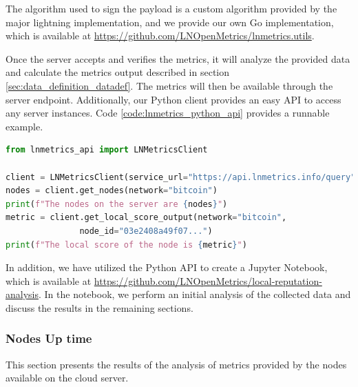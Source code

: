 The algorithm used to sign the payload is a custom algorithm provided by the major
lightning implementation, and we provide our own Go implementation, which is available
at \url{https://github.com/LNOpenMetrics/lnmetrics.utils}.

Once the server accepts and verifies the metrics, it will analyze the provided data and calculate the
metrics output described in section \ref{sec:data_definition_datadef}. The metrics will then be available
through the server endpoint. Additionally, our Python client provides an easy API to access any server instances.
Code \ref{code:lnmetrics_python_api} provides a runnable example.

\begin{lstlisting}[language=python, basicstyle=\small,
                  caption={Python script to show a runnable example of our Python wrapper API usage.}, 
                  label={code:lnmetrics_python_api}]
from lnmetrics_api import LNMetricsClient

client = LNMetricsClient(service_url="https://api.lnmetrics.info/query")
nodes = client.get_nodes(network="bitcoin")
print(f"The nodes on the server are {nodes}")
metric = client.get_local_score_output(network="bitcoin", 
               node_id="03e2408a49f07...")
print(f"The local score of the node is {metric}")
\end{lstlisting}

In addition, we have utilized the Python API to create a Jupyter Notebook, which 
is available at \url{https://github.com/LNOpenMetrics/local-reputation-analysis}.
In the notebook, we perform an initial analysis of the collected data and discuss 
the results in the remaining sections.

\subsubsection{Nodes Up time}
\label{sec:node_uptime}

This section presents the results of the analysis of metrics provided by the 
nodes available on the cloud server.

